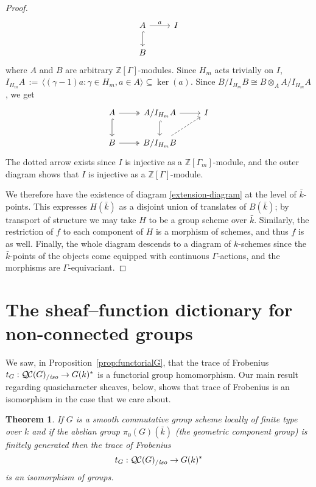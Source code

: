 \documentclass[11pt]{amsart}
\theoremstyle{plain}
\newtheorem{theorem}{Theorem}[section]
\theoremstyle{definition}
\theoremstyle{remark}
\newcommand{\ZZ}{{\mathbb{Z}}}
\newcommand{\bFq}{\bar{k}}
\newcommand{\Fq}{k}
\newcommand{\ceq}{{\, :=\, }}
\newcommand{\QC}{{\mathcal{Q\hskip-0.8pt C}}}
\newcommand{\QCiso}[1]{\QC(#1)_{/\textit{iso}}}
\newcommand{\trFrob}[1]{t_{#1}}
\begin{document}
\begin{proof}
  \[
  \begin{tikzcd}
  A \rar{a} \arrow[hook]{d} & I \\
  B
  \end{tikzcd}
  \]
  where $A$ and $B$ are arbitrary $\ZZ[\Gamma]$-modules.  Since $H_m$ acts trivially on $I$,
  $I_{H_m}A \ceq \langle (\gamma-1)a : \gamma \in H_m, a \in A \rangle \subseteq \ker(a).$
  Since $B / I_{H_m}B \cong B \otimes_A A / I_{H_m}A$, we get
  \[
  \begin{tikzcd}
  A \arrow[two heads]{r} \arrow[hook]{d} & A/I_{H_m}A \rar \arrow[hook]{d} & I \\
  B \arrow[two heads]{r} & B/I_{H_m}B \arrow[dashed]{ur} & {}
  \end{tikzcd}
  \]
  The dotted arrow exists since $I$ is injective as a
  $\ZZ[\Gamma_m]$-module, and the outer diagram shows that $I$ is
  injective as a $\ZZ[\Gamma]$-module.

  We therefore have the existence of diagram \eqref{extension-diagram}
  at the level of $\bFq$-points.  This expresses $H(\bFq)$ as a
  disjoint union of translates of $B(\bFq)$; by transport of structure
  we may take $H$ to be a group scheme over $\bFq$.  Similarly, the
  restriction of $f$ to each component of $H$ is a morphism of
  schemes, and thus $f$ is as well.  Finally, the whole diagram
  descends to a diagram of $\Fq$-schemes since the $\bFq$-points of
  the objects come equipped with continuous $\Gamma$-actions, and the
  morphisms are $\Gamma$-equivariant.
\end{proof}

\section{The sheaf--function dictionary for non-connected groups}
\label{sec:snake}

We saw, in Proposition~\ref{prop:functorialG}, that the trace of Frobenius
$\trFrob{G} : \QCiso{G} \to G(\Fq)^*$ is a functorial group homomorphism.
Our main result regarding quasicharacter sheaves, below, shows that
trace of Frobenius is an isomorphism in the case that we care about.

%
\begin{theorem}\label{thm:snake}
  If $G$ is a smooth commutative group scheme locally of finite type over
  $\Fq$ and if the abelian group $\pi_0(G)(\bFq)$ (the geometric
  component group) is finitely generated then the trace of Frobenius
  \[
  \trFrob{G} : \QCiso{G} \to G(\Fq)^*
  \]
  is an isomorphism of groups.
\end{theorem}
\end{document}
